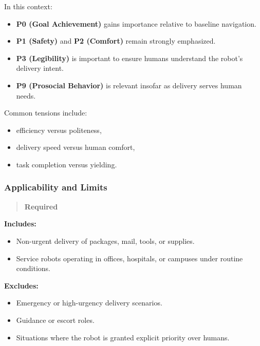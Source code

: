 \documentclass[utf8]{frontiers_suppmat} %
\providecommand{\tightlist}{%
  \setlength{\itemsep}{0pt}\setlength{\parskip}{0pt}}
\begin{document}
In this context:

\begin{itemize}
\tightlist
\item
  \textbf{P0 (Goal Achievement)} gains importance relative to baseline
  navigation.
\item
  \textbf{P1 (Safety)} and \textbf{P2 (Comfort)} remain strongly
  emphasized.
\item
  \textbf{P3 (Legibility)} is important to ensure humans understand the
  robot's delivery intent.
\item
  \textbf{P9 (Prosocial Behavior)} is relevant insofar as delivery
  serves human needs.
\end{itemize}

Common tensions include:

\begin{itemize}
\tightlist
\item
  efficiency versus politeness,
\item
  delivery speed versus human comfort,
\item
  task completion versus yielding.
\end{itemize}

\subsubsection{Applicability and Limits}\label{applicability-and-limits}

\begin{quote}
\textbf{Required}
\end{quote}

\textbf{Includes:}

\begin{itemize}
\tightlist
\item
  Non-urgent delivery of packages, mail, tools, or supplies.
\item
  Service robots operating in offices, hospitals, or campuses under
  routine conditions.
\end{itemize}

\textbf{Excludes:}

\begin{itemize}
\tightlist
\item
  Emergency or high-urgency delivery scenarios.
\item
  Guidance or escort roles.
\item
  Situations where the robot is granted explicit priority over humans.
\end{itemize}
\end{document}
